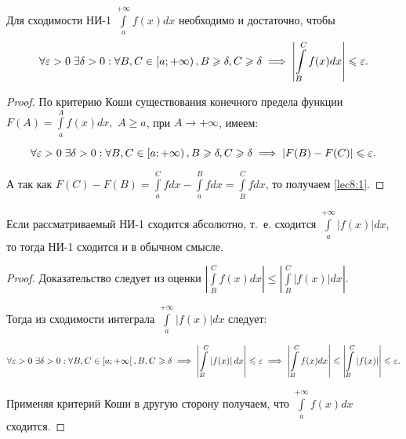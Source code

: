 \documentclass[../../main.tex]{subfiles}
\begin{document}
\begin {thm}
Для сходимости НИ-1 $\displaystyle \int\limits_{a}^{+\infty} f(x)dx$
необходимо и достаточно, чтобы 
 \begin{equation} \label{lec8:1}
  \forall \varepsilon > 0 \;  \exists \delta > 
  0 : \forall B, C \in \left[a; +\infty\right), B \geqslant \delta, C \geqslant \delta 
  \implies \left| \int\limits_{B}^{C} f(x)dx \right| \leqslant \varepsilon.
 \end{equation}
\end {thm}

\begin{proof}
По критерию Коши существования конечного предела функции
$F(A) = \displaystyle\int\limits_{a}^{A}f(x)dx,$ $A \geq a$, при $A \to 
+\infty$, имеем:
 
 \[\forall \varepsilon > 0 \; \exists \delta > 0 : \forall B, C \in \left[a; +\infty 
 \right), B \geqslant \delta, C \geqslant \delta \implies \left|F(B) - F(C) \right| \leqslant 
 \varepsilon.\]
 
 А так как
 $F(C) - F(B) = \displaystyle\int\limits_{a}^{C}fdx - 
 \displaystyle\int\limits_{a}^{B}fdx = \int\limits_{B}^{C}fdx$,
 то получаем \eqref{lec8:1}.
\end{proof}

\begin{crl}
 Если рассматриваемый НИ-1 сходится абсолютно, т.~е. сходится
 $\displaystyle\int\limits_{a}^{+\infty}|f(x)|dx$, то тогда НИ-1 сходится и в 
 обычном смысле.
\end{crl}

 \begin{proof}
 Доказательство следует из оценки
$\left|\displaystyle\int\limits_{B}^{C}f(x)dx \right| \leq 
\left|\displaystyle\int\limits_{B}^{C}|f(x)|dx \right|$.

Тогда из сходимости интеграла $\displaystyle\int\limits_{a}^{+\infty}\left| 
f(x) \right| dx $ следует:

\[\forall \varepsilon > 0 \; \exists \delta > 0 : \forall B, C \in \left[a; +\infty 
\right[, B, C \geqslant \delta \implies \left| \int\limits_{B}^{C} \left| f(x) 
\right| dx \right| \leqslant \varepsilon \implies \left| \int\limits_{B}^{C} f(x) dx 
\right| \leqslant \left|\int\limits_{B}^{C} \left| f(x) \right| \right| \leqslant \varepsilon.\]

Применяя критерий Коши в другую сторону получаем, что 
$\displaystyle\int\limits_{a}^{+\infty}f(x)dx$ сходится.
 \end{proof}
\end{document}
